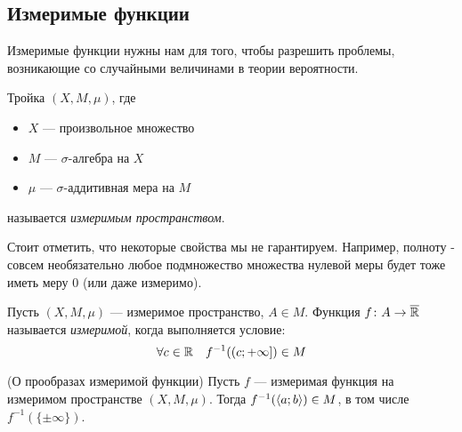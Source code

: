 \subsection{Измеримые функции}

\begin{note}
	Измеримые функции нужны нам для того, чтобы разрешить проблемы, возникающие со случайными величинами в теории вероятности.
\end{note}

\begin{definition}
	Тройка $(X, M, \mu)$, где
	\begin{itemize}
		\item $X$ --- произвольное множество
		
		\item $M$ --- $\sigma$-алгебра на $X$
		
		\item $\mu$ --- $\sigma$-аддитивная мера на $M$
	\end{itemize}
	называется \textit{измеримым пространством}.
\end{definition}

\begin{note}
	Стоит отметить, что некоторые свойства мы не гарантируем. Например, полноту - совсем необязательно любое подмножество множества нулевой меры будет тоже иметь меру 0 (или даже измеримо).
\end{note}

\begin{definition}
	Пусть $(X, M, \mu)$ --- измеримое пространство, $A \in M$. Функция $f \colon A \to \overline{\mathbb{R}}$ называется \textit{измеримой}, когда выполняется условие:
	\[
		\forall c \in \mathbb{R} \quad f^{-1}(\left(c; +\infty\right]) \in M
	\]
\end{definition}

\begin{lemma} (О прообразах измеримой функции)
	Пусть $f$ --- измеримая функция на измеримом пространстве $(X, M, \mu)$. Тогда $f^{-1}(\left\langle a; b\right\rangle) \in M$, в том числе $f^{-1}(\{\pm\infty\})$.
\end{lemma}

